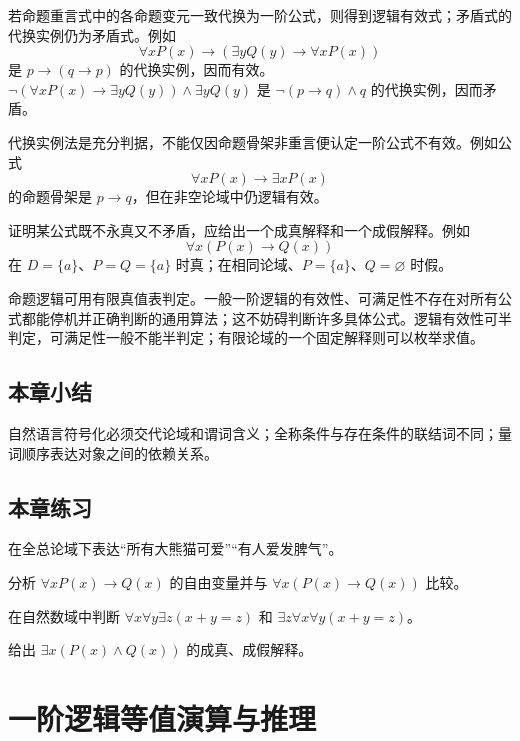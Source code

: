 \documentclass[UTF8,fontset=none,zihao=-4,a4paper]{ctexart}
\newcommand{\chapterpage}[1]{\clearpage\section{#1}}
\newcommand{\exercise}{\subsection{本章练习}}
\begin{document}
若命题重言式中的各命题变元一致代换为一阶公式，则得到逻辑有效式；矛盾式的代换实例仍为矛盾式。例如
\[
\forall xP(x)\to(\exists yQ(y)\to\forall xP(x))
\]
是 $p\to(q\to p)$ 的代换实例，因而有效。$\neg(\forall xP(x)\to\exists yQ(y))\land\exists yQ(y)$ 是 $\neg(p\to q)\land q$ 的代换实例，因而矛盾。

代换实例法是充分判据，不能仅因命题骨架非重言便认定一阶公式不有效。例如公式
\[
\forall xP(x)\to\exists xP(x)
\]
的命题骨架是 $p\to q$，但在非空论域中仍逻辑有效。

证明某公式既不永真又不矛盾，应给出一个成真解释和一个成假解释。例如
\[
\forall x(P(x)\to Q(x))
\]
在 $D=\{a\}$、$P=Q=\{a\}$ 时真；在相同论域、$P=\{a\}$、$Q=\varnothing$ 时假。

命题逻辑可用有限真值表判定。一般一阶逻辑的有效性、可满足性不存在对所有公式都能停机并正确判断的通用算法；这不妨碍判断许多具体公式。逻辑有效性可半判定，可满足性一般不能半判定；有限论域的一个固定解释则可以枚举求值。

\subsection{本章小结}
自然语言符号化必须交代论域和谓词含义；全称条件与存在条件的联结词不同；量词顺序表达对象之间的依赖关系。

\exercise
\begin{enumerate}[label=4.\arabic*.,leftmargin=2.8em]
\begin{samepage}
\item  在全总论域下表达“所有大熊猫可爱”“有人爱发脾气”。
\end{samepage}

\begin{samepage}
\item  分析 $\forall xP(x)\to Q(x)$ 的自由变量并与 $\forall x(P(x)\to Q(x))$ 比较。
\end{samepage}

\begin{samepage}
\item  在自然数域中判断 $\forall x\forall y\exists z(x+y=z)$ 和 $\exists z\forall x\forall y(x+y=z)$。
\end{samepage}

\begin{samepage}
\item  给出 $\exists x(P(x)\land Q(x))$ 的成真、成假解释。
\end{samepage}
\end{enumerate}

\chapterpage{一阶逻辑等值演算与推理}
\end{document}
